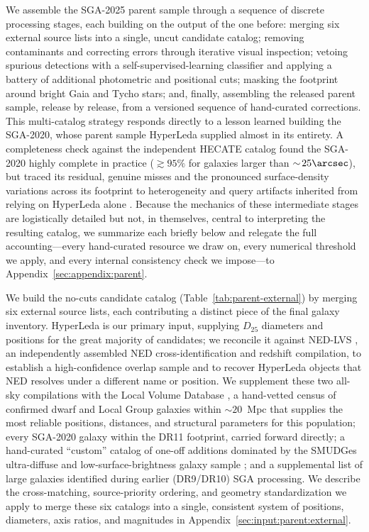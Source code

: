\documentclass[modern,linenumbers]{aastex701}
\begin{document}
We assemble the SGA-2025 parent sample through a sequence of discrete
processing stages, each building on the output of the one before:
merging six external source lists into a single, uncut candidate
catalog; removing contaminants and correcting errors through iterative
visual inspection; vetoing spurious detections with a
self-supervised-learning classifier and applying a battery of
additional photometric and positional cuts; masking the footprint
around bright Gaia and Tycho stars; and, finally, assembling the
released parent sample, release by release, from a versioned sequence
of hand-curated corrections. This multi-catalog strategy responds
directly to a lesson learned building the SGA-2020, whose parent sample
HyperLeda \citep{makarov14a} supplied almost in its entirety. A
completeness check against the independent HECATE catalog
\citep{kovlakas21a} found the SGA-2020 highly complete in practice
($\gtrsim\!95\%$ for galaxies larger than $\sim\!25\arcsec$), but traced
its residual, genuine misses and the pronounced surface-density
variations across its footprint to heterogeneity and query artifacts
inherited from relying on HyperLeda alone \citep{moustakas23a}. Because
the mechanics of these
intermediate stages are logistically detailed but not, in themselves,
central to interpreting the resulting catalog, we summarize each briefly
below and relegate the full accounting---every hand-curated resource we
draw on, every numerical threshold we apply, and every internal
consistency check we impose---to Appendix~\ref{sec:appendix:parent}.

We build the no-cuts candidate catalog (Table~\ref{tab:parent-external})
by merging six external source lists, each contributing a distinct
piece of the final galaxy inventory. HyperLeda \citep{makarov14a} is
our primary input, supplying $D_{25}$ diameters and positions for the
great majority of candidates; we reconcile it against NED-LVS
\citep[NED Local Volume Sample;][]{cook23a}, an independently assembled
NED cross-identification and redshift compilation, to establish a
high-confidence overlap sample and to recover HyperLeda objects that
NED resolves under a different name or position. We supplement these
two all-sky compilations with the Local Volume Database \citep[LVD;][]
{pace25a}, a hand-vetted census of confirmed dwarf and Local Group
galaxies within $\sim\!20$~Mpc that supplies the most reliable
positions, distances, and structural parameters for this population;
every SGA-2020 galaxy \citep{moustakas23a} within the DR11 footprint,
carried forward directly; a hand-curated ``custom'' catalog of one-off
additions dominated by the SMUDGes ultra-diffuse and
low-surface-brightness galaxy sample \citep{zaritsky23a}; and a
supplemental list of large galaxies identified during earlier
(DR9/DR10) SGA processing. We describe the cross-matching,
source-priority ordering, and geometry standardization we apply to
merge these six catalogs into a single, consistent system of
positions, diameters, axis ratios, and magnitudes in
Appendix~\ref{sec:input:parent:external}.
\end{document}
